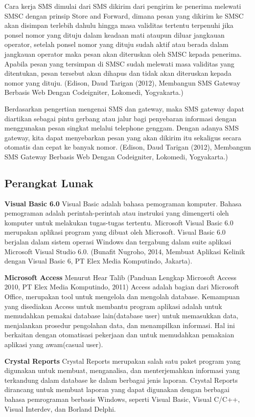 \documentclass{jtetiproposalskripsi}
\begin{document}
Cara kerja SMS dimulai dari SMS dikirim dari pengirim ke penerima melewati SMSC dengan prinsip Store and Forward, dimana pesan yang dikirim ke SMSC akan disimpan terlebih dahulu hingga masa validitas tertentu terpenuhi jika ponsel nomor yang dituju dalam keadaan mati ataupun diluar jangkauan operator, setelah ponsel nomor yang dituju sudah aktif atau berada dalam jangkauan operator maka pesan akan diteruskan oleh SMSC kepada penerima. Apabila pesan yang tersimpan di SMSC sudah melewati masa validitas yang ditentukan, pesan tersebut akan dihapus dan tidak akan diteruskan kepada nomor yang dituju. (Edison, Daud Tarigan (2012), Membangun SMS Gateway Berbasis Web Dengan Codeigniter, Lokomedi, Yogyakarta.)

Berdasarkan pengertian mengenai SMS dan gateway, maka SMS gateway dapat diartikan sebagai pintu gerbang atau jalur bagi penyebaran informasi dengan menggunakan pesan singkat melalui telephone genggam. Dengan adanya SMS gateway, kita dapat menyebarkan pesan yang akan dikirim itu sekaligus secara otomatis dan cepat ke banyak nomor. (Edison, Daud Tarigan (2012), Membangun SMS Gateway Berbasis Web Dengan Codeigniter, Lokomedi, Yogyakarta.)

\subsection{Perangkat Lunak}
\textbf{Visual Basic 6.0}
Visual Basic adalah bahasa pemograman komputer. Bahasa pemograman adalah perintah-perintah atau instruksi yang dimengerti oleh komputer untuk melakukan tugas-tugas tertentu. Microsoft Visual Basic 6.0 merupakan aplikasi program yang dibuat oleh Microsoft. Visual Basic 6.0 berjalan dalam sistem operasi Windows dan tergabung dalam suite aplikasi Microsoft Visual Studio 6.0. (Bunafit Nugroho, 2014, Membuat Aplikasi Kelinik dengan Visual Basic 6, PT Elex Media Komputindo, Jakarta).

\textbf{Microsoft Access}
Menurut Hear Talib (Panduan Lengkap Microsoft Access 2010, PT Elex Media Komputindo, 2011) Access adalah bagian dari Microsoft Office, merupakan tool untuk mengelola dan mengolah database. Kemampuan yang disediakan Access untuk membantu program aplikasi adalah untuk memudahkan pemakai database lain(database user) untuk memasukkan data, menjalankan prosedur pengolahan data, dan menampilkan informasi. Hal ini berkaitan dengan otomatisasi pekerjaan dan untuk memudahkan pemakaian aplikasi yang awam(casual user).

\textbf{Crystal Reports}
Crystal Reports merupakan salah satu paket program yang digunakan untuk membuat, menganalisa, dan menterjemahkan informasi yang terkandung dalam database ke dalam berbagai jenis laporan.
Crystal Reports dirancang untuk membuat laporan yang dapat digunakan dengan berbagai bahasa pemrograman berbasis Windows, seperti Visual Basic, Visual C/C++, Visual Interdev, dan Borland Delphi.
\end{document}
